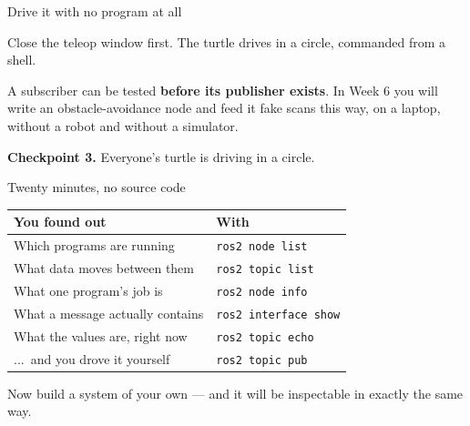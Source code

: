 \documentclass[aspectratio=169]{beamer}
\begin{document}
\begin{frame}[fragile]{Drive it with no program at all}

  \vspace{0.5em}
  \small
  Close the teleop window first. The turtle drives in a circle, commanded from a shell.

  \vspace{0.6em}
  \begin{underhood}
    \footnotesize
    A subscriber can be tested \textbf{before its publisher exists}. In Week 6 you will write
    an obstacle-avoidance node and feed it fake scans this way, on a laptop, without a robot
    and without a simulator.
  \end{underhood}

  \vspace{0.2em}
  \centering\footnotesize \textbf{Checkpoint 3.} Everyone's turtle is driving in a circle.
\end{frame}

\begin{frame}{Twenty minutes, no source code}
  \small
  \begin{center}
  \begin{tabular}{@{}p{5.4cm}p{5.6cm}@{}}
    \toprule
    \textbf{You found out} & \textbf{With} \\
    \midrule
    Which programs are running & \texttt{ros2 node list} \\[0.25em]
    What data moves between them & \texttt{ros2 topic list} \\[0.25em]
    What one program's job is & \texttt{ros2 node info} \\[0.25em]
    What a message actually contains & \texttt{ros2 interface show} \\[0.25em]
    What the values are, right now & \texttt{ros2 topic echo} \\[0.25em]
    ...\ and you drove it yourself & \texttt{ros2 topic pub} \\
    \bottomrule
  \end{tabular}
  \end{center}

  \vspace{0.6em}

  \vspace{0.4em}
  \centering\footnotesize
  Now build a system of your own --- and it will be inspectable in exactly the same way.
\end{frame}
\end{document}
